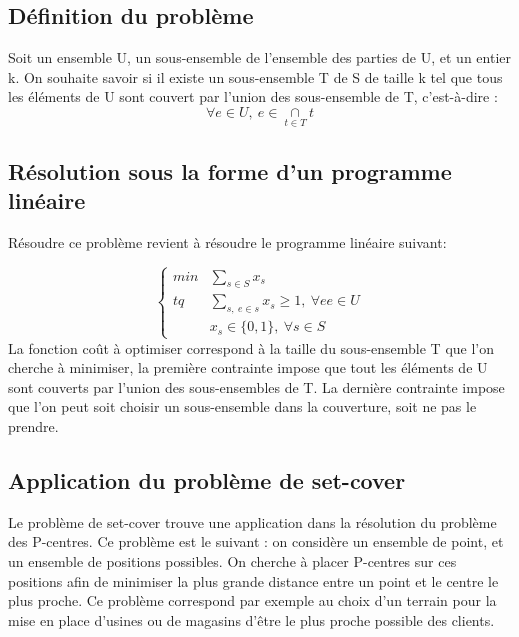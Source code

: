 \documentclass[12pt]{report}
\begin{document}
\subsection{Définition du problème}

Soit un ensemble U, un sous-ensemble de l'ensemble des parties de U, et un entier k. On souhaite savoir si il existe un sous-ensemble T de S de taille k tel que tous les éléments de U sont couvert par l'union des sous-ensemble de T, c'est-à-dire :
$$
\forall e \in U, \ e \in \underset{t \in T}{\cap}t
$$

\subsection{Résolution sous la forme d'un programme linéaire}

Résoudre ce problème revient à résoudre le programme linéaire suivant:

$$
\left\{
    \begin{array}{ll}
        min &  \underset{s \in S}{\sum}x_s \\
        tq &  \underset{s , \ e\in s} {\sum}x_s \ge 1, \ \forall e e \in U \\
         & x_s \in \{ 0,1 \}, \ \forall s \in S
    \end{array}
\right.
$$
La fonction coût à optimiser correspond à la taille du sous-ensemble T que l'on cherche à minimiser, la première contrainte impose que tout les éléments de U sont couverts par l'union des sous-ensembles de T. La dernière contrainte impose que l'on peut soit choisir un sous-ensemble dans la couverture, soit ne pas le prendre.

\subsection{Application du problème de set-cover}

Le problème de set-cover trouve une application dans la résolution du problème des P-centres. Ce problème est le suivant : on considère un ensemble de point, et un ensemble de positions possibles. On cherche à placer P-centres sur ces positions afin de minimiser la plus grande distance entre un point et le centre le plus proche. Ce problème correspond par exemple au choix d'un terrain pour la mise en place d'usines ou de magasins d'être le plus proche possible des clients.
\end{document}
